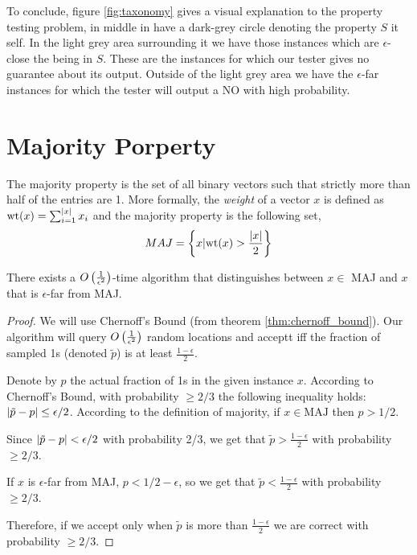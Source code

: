To conclude, figure \ref{fig:taxonomy} gives a visual explanation to the property testing problem, in middle in have a dark-grey circle denoting the property \(S\) it self. 
In the light grey area surrounding it we have those instances which are \(\epsilon\)-close the being in \(S\). 
These are the instances for which our tester gives no guarantee about its output. 
Outside of the light grey area we have the \(\epsilon\)-far instances for which the tester will output a NO with high probability.

%
%
%

\section{Majority Porperty}

The majority property is the set of all binary vectors such that strictly more than half of the entries are 1. 
More formally, the \emph{weight} of a vector \(x\) is defined as \(\text{wt}(x) = \sum_{i=1}^{\left|x\right|}x_i\) and the majority property is the following set, \[MAJ = \left\{x | \text{wt}(x) > \frac{\left|x\right|}{2}\right\}\]

\begin{proposition}
    There exists a \(O\left(\frac{1}{\epsilon^2}\right)\)-time algorithm that distinguishes between \(x\in\) MAJ and \(x\) that is \(\epsilon\)-far from MAJ.
\end{proposition}

\begin{proof}
    We will use Chernoff's Bound (from theorem \ref{thm:chernoff_bound}).
    Our algorithm will query \(O\left(\frac{1}{\epsilon^2}\right)\) random locations and acceptt iff  the fraction of sampled 1s (denoted \(\tilde{p}\)) is at least \(\frac{1-\epsilon}{2}\).

    Denote by \(p\) the actual fraction of 1s in the given instance \(x\).
    According to Chernoff's Bound, with probability \(\geq 2/3\) the following inequality holds: \(\left|\tilde{p}-p\right| \leq \epsilon/2\).
    According to the definition of majority, if \(x \in \text{MAJ}\) then \(p > 1/2\).

    Since \(\left|\tilde{p}-p\right|<\epsilon/2\) with probability 2/3, we get that \(\tilde{p} > \frac{1-\epsilon}{2}\) with probability \(\geq 2/3\).

    If \(x\) is \(\epsilon\)-far from MAJ, \(p<1/2-\epsilon\), so we get that \(\tilde{p} < \frac{1-\epsilon}{2}\) with probability \(\geq 2/3\).
    
    Therefore, if we accept only when \(\tilde{p}\) is more than \(\frac{1-\epsilon}{2}\) we are correct with probability \(\geq 2/3\).
\end{proof}

